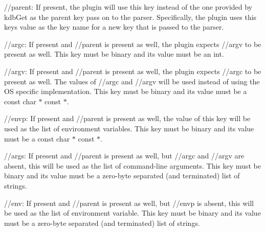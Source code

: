 \begin{DoxyItemize}
\item {\ttfamily //parent}\+: If present, the plugin will use this key instead of the one provided by {\ttfamily kdb\+Get} as the parent key pass on to the parser. Specifically, the plugin uses this keys value as the key name for a new key that is passed to the parser.
\item {\ttfamily //argc}\+: If present and {\ttfamily //parent} is present as well, the plugin expects {\ttfamily //argv} to be present as well. This key must be binary and its value must be an {\ttfamily int}.
\item {\ttfamily //argv}\+: If present and {\ttfamily //parent} is present as well, the plugin expects {\ttfamily //argc} to be present as well. The values of {\ttfamily //argc} and {\ttfamily //argv} will be used instead of using the OS specific implementation. This key must be binary and its value must be a {\ttfamily const char $\ast$ const $\ast$}.
\item {\ttfamily //envp}\+: If present and {\ttfamily //parent} is present as well, the value of this key will be used as the list of environment variables. This key must be binary and its value must be a {\ttfamily const char $\ast$ const $\ast$}.
\item {\ttfamily //args}\+: If present and {\ttfamily //parent} is present as well, but {\ttfamily //argc} and {\ttfamily //argv} are absent, this will be used as the list of command-\/line arguments. This key must be binary and its value must be a zero-\/byte separated (and terminated) list of strings.
\item {\ttfamily //env}\+: If present and {\ttfamily //parent} is present as well, but {\ttfamily //envp} is absent, this will be used as the list of environment variable. This key must be binary and its value must be a zero-\/byte separated (and terminated) list of strings. 
\end{DoxyItemize}